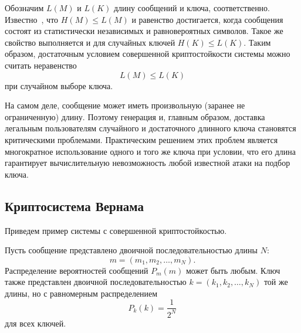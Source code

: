 

Обозначим $L(M)$ и $L(K)$ длину сообщений и ключа, соответственно. Известно~\cite{GabPil:2007}, что $H(M)\leq L(M)$ и равенство достигается, когда сообщения состоят из статистически независимых и равновероятных символов. Такое же свойство выполняется и для случайных ключей $H(K)\leq L(K)$. Таким образом, достаточным условием совершенной криптостойкости системы можно считать неравенство
 \[ L(M) \leq L(K)\]
при случайном выборе ключа.


На самом деле, сообщение может иметь произвольную (заранее не ограниченную) длину. Поэтому генерация и, главным образом, доставка легальным пользователям случайного и достаточного длинного ключа становятся критическими проблемами. Практическим решением этих проблем является многократное использование одного и того же ключа при условии, что его длина гарантирует вычислительную невозможность любой известной атаки на подбор ключа.


\subsection{Криптосистема Вернама}

Приведем пример системы с совершенной криптостойкостью.

Пусть сообщение представлено двоичной последовательностью длины $N$:
    \[ m = (m_1, m_2, \dots, m_N). \]
Распределение вероятностей сообщений $P_m(m)$ может быть любым.  Ключ также представлен двоичной последовательностью $ k = (k_1, k_2, \dots, k_N)$ той же длины, но с равномерным распределением
    \[ P_k(k) = \frac{1}{2^N} \]
для всех ключей.

